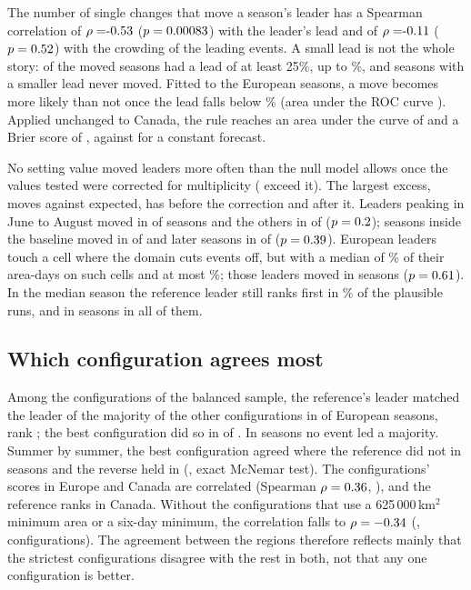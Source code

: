 \documentclass{amsdraft}
\begin{document}
The number of single changes that move a season's leader has a Spearman
correlation of $\rho = \RhoLead{}$ ($p = 0.00083{}$) with the leader's lead
and of $\rho = \RhoCrowding{}$ ($p = 0.52{}$) with the crowding of the
leading events. A small lead is not the whole story: \NMovedBigLead{} of the
\NLeaderMoved{} moved seasons had a lead of at least 25\%, up to
\MaxMovedLead{}\%, and \NStableSmallLead{} seasons with a smaller lead never
moved. Fitted to the European seasons, a move becomes more likely
than not once the lead falls below \LeadEvenOdds{}\% (area under the ROC
curve \AUCFit{}). Applied unchanged to Canada, the rule reaches an area under
the curve of \AUCValidate{} and a Brier score of \BrierValidate{}, against
\BrierClimatology{} for a constant forecast.

No setting value moved leaders more often than the null model allows once
the \NSettingValues{} values tested were corrected for multiplicity
(\NSettingsAboveNull{} exceed it). The largest excess, \NMovedNullMin{}
moves against \ExpectedNullMin{} expected, has \PNullMinRaw{} before the
correction and \PNullMinHolm{} after it. Leaders peaking in June to August
moved in \SeasonK{} of \SeasonN{} seasons and the others in \SeasonKRest{}
of \SeasonNRest{} ($p = 0.2{}$); seasons inside the baseline moved in
\BaselineK{} of \BaselineN{} and later seasons in \BaselineKRest{} of
\BaselineNRest{} ($p = 0.39{}$). \EdgeN{} European leaders touch a cell
where the domain cuts events off, but with a median of \EdgeShareMedian{}\%
of their area-days on such cells and at most \EdgeShareMax{}\%; those
leaders moved in \EdgeK{} seasons ($p = 0.61{}$). In the median season the
reference leader still ranks first in \LeaderShareMedian{}\% of the
plausible runs, and in \NLeaderAgreeAll{} seasons in all of them.

\subsection{Which configuration agrees most}
\label{sec:agree}

Among the \NCandidates{} configurations of the balanced sample, the
reference's leader matched the leader of the majority of the other
configurations in \RefAgree{} of \RefAgreeOf{} European seasons, rank
\RefRank{}; the best configuration did so in \TopAgree{} of \TopAgreeOf{}.
In \NNoConsensus{} seasons no event led a majority. Summer by summer, the
best configuration agreed where the reference did not in \NTopOnly{} seasons
and the reverse held in \NRefOnly{} (\PTopVsRef{}, exact McNemar test). The configurations'
scores in Europe and Canada are correlated (Spearman $\rho =
0.36{}$, \PConsensus{}), and the reference ranks \RefRankCanada{}
in Canada. Without the configurations that use a 625\,000\,km$^2$ minimum
area or a six-day minimum, the correlation falls to $\rho =
-0.34{}$ (\PConsensusMild{}, \NCandidatesMild{}
configurations). The agreement between the regions therefore
reflects mainly that the strictest configurations disagree with the rest in
both, not that any one configuration is better.
\end{document}
